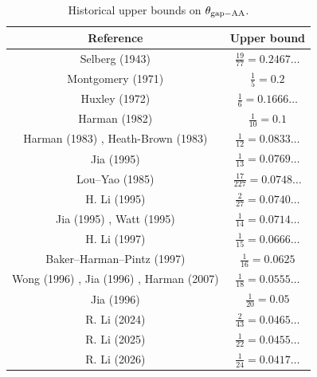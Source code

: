 \begin{table}[ht]
    \caption{Historical upper bounds on $\theta_{\mathrm{gap-AA}}$.}
    \label{gapaa-table}
    \centering
    \renewcommand{\arraystretch}{1.2}
    \begin{tabular}{|c|c|}
    \hline
    Reference & Upper bound \\
    \hline
    Selberg (1943) \cite{selberg_1943} & $\frac{19}{77}=0.2467\dots$\\
    \hline
    Montgomery (1971) \cite{montgomery_topics_1971} & $\frac{1}{5}=0.2$ \\
    \hline
    Huxley (1972) \cite{Huxley} & $\frac{1}{6} = 0.1666\dots$ \\
    \hline
    Harman (1982) \cite{harman_1982} & $\frac{1}{10} = 0.1$ \\
    \hline
    Harman (1983) \cite{harman_1983}, Heath-Brown (1983) \cite{heathbrown_sieve_1984}  & $\frac{1}{12} = 0.0833\dots$ \\
    \hline
    Jia (1995) \cite{jia_goldbach_1994} & $\frac{1}{13} = 0.0769\dots$ \\
    \hline
    Lou--Yao (1985) \cite{lou_yao_1985} & $\frac{17}{227}= 0.0748\dots$ \\
    \hline
    H. Li (1995) \cite{li_goldbach_1995} & $\frac{2}{27} = 0.0740\dots$ \\
    \hline
    Jia (1995) \cite{jia_difference_1995}, Watt (1995) \cite{watt_short_1995} & $\frac{1}{14}=0.0714\dots$ \\
    \hline
    H. Li (1997) \cite{li_short_1997} & $\frac{1}{15}=0.0666\dots$ \\
    \hline
    Baker--Harman--Pintz (1997) \cite{baker-harman-pintz_goldbach_1997} & $\frac{1}{16} = 0.0625$ \\
    \hline
    Wong (1996) \cite{wong_thesis_1996}, Jia (1996) \cite{jia_exceptional_1996}, Harman (2007) \cite{harman-book} & $\frac{1}{18} = 0.0555\dots$ \\
    \hline
    Jia (1996) \cite{jia_almost_all} & $\frac{1}{20} = 0.05$ \\
    \hline
    R. Li (2024) \cite{li_primes_almost_2024} & $\frac{2}{43} = 0.0465\dots$ \\
    \hline
    R. Li (2025) \cite{li_primes_almost_II_2025} & $\frac{1}{22} = 0.0455\dots$ \\
    \hline
    R. Li (2026) \cite{li_primes_almost_III_2026} & $\frac{1}{24} = 0.0417\dots$ \\
    \hline
    \end{tabular}
    \end{table}

